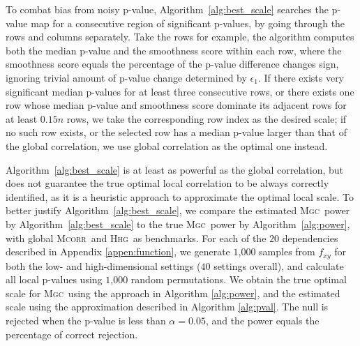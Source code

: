 \documentclass[11pt]{article}
\providecommand{\sct}[1]{{\normalfont\textsc{#1}}}
\newcommand{\Mgc}{\sct{Mgc}}
\newcommand{\Hhg}{\sct{Hhg}}
\newcommand{\Mcorr}{\sct{Mcorr}}
\begin{document}
To combat bias from noisy p-value, Algorithm~\ref{alg:best_scale} searches the p-value map for a consecutive region of significant p-values, by going through the rows and columns separately. Take the rows for example, the algorithm computes both the median p-value and the smoothness score within each row, where the smoothness score equals the percentage of the p-value difference changes sign, ignoring trivial amount of p-value change determined by $\epsilon_{1}$. If there exists very significant median p-values for at least three consecutive rows, or there exists one row whose median p-value and smoothness score dominate its adjacent rows for at least $0.15n$ rows, we take the corresponding row index as the desired scale; if no such row exists, or the selected row has a median p-value larger than that of the global correlation, we use global correlation as the optimal one instead. 

Algorithm~\ref{alg:best_scale} is at least as powerful as the global correlation, but does not guarantee the true optimal local correlation to be always correctly identified, as it is a heuristic approach to approximate the optimal local scale. To better justify Algorithm~\ref{alg:best_scale}, we compare the estimated \Mgc~power by Algorithm~\ref{alg:best_scale} to the true \Mgc~power by Algorithm~\ref{alg:power}, with  global \Mcorr~and \Hhg~as benchmarks. For each of the $20$ dependencies described in Appendix \ref{appen:function}, we generate $1$,$000$ samples from $f_{xy}$ for both the low- and high-dimensional settings ($40$ settings overall), and calculate all local p-values using $1$,$000$ random permutations. 
We obtain the true optimal scale for \Mgc~using the approach in Algorithm \ref{alg:power}, and the estimated scale using the approximation described in Algorithm \ref{alg:pval}.  
The null is rejected when the p-value is less than $\alpha=0.05$, and the power equals the percentage of correct rejection. 
\end{document}
